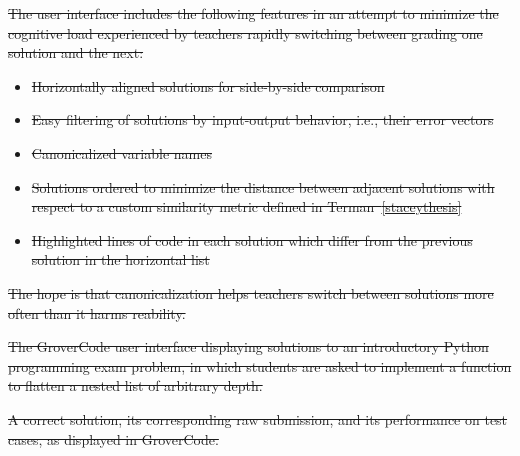 \documentclass[12pt,twoside]{mitthesis}
\providecommand{\DIFdeltex}[1]{{\protect\color{red}\sout{#1}}}                      %
\providecommand{\DIFdelFL}[1]{\DIFdel{#1}} %
\providecommand{\DIFdel}[1]{\texorpdfstring{\DIFdeltex{#1}}{}} %
\begin{document}
{{{{{{{{{{%
\DIFdel{The user interface includes the following features in an attempt to minimize the cognitive load experienced by teachers rapidly switching between grading one solution and the next:
}%
 \begin{itemize} %
\item%
\DIFdel{Horizontally aligned solutions for side-by-side comparison
}%
\item%
\DIFdel{Easy filtering of solutions by input-output behavior, i.e., their error vectors
}%
\item%
\DIFdel{Canonicalized variable names
}%
\item%
\DIFdel{Solutions ordered to minimize the distance between adjacent solutions with respect to a custom similarity metric defined in Terman~\ref{staceythesis}
}%
\item%
\DIFdel{Highlighted lines of code in each solution which differ from the previous solution in the horizontal list
}
 \end{itemize} %

\DIFdel{The hope is that canonicalization helps teachers switch between solutions more often than it harms reability.
}%

{%
\DIFdelFL{The GroverCode user interface displaying solutions to an introductory Python programming exam problem, in which students are asked to implement a function to flatten a nested list of arbitrary depth.
}}

{%
\DIFdelFL{A correct solution, its corresponding raw submission, and its performance on test cases, as displayed in GroverCode.}}

}}}}}}}}}}
\end{document}
